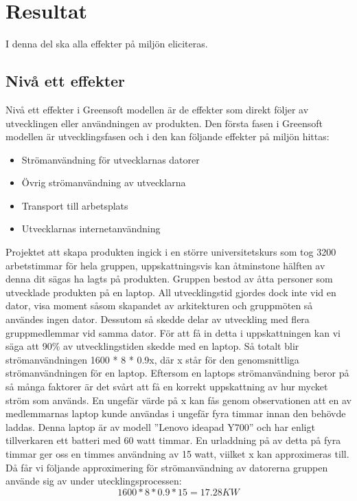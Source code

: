 \section{Resultat}
\label{sec:joel_a-results}
I denna del ska alla effekter på miljön eliciteras. 
\subsection{Nivå ett effekter}
Nivå ett effekter i Greensoft modellen är de effekter som direkt följer av utvecklingen eller användningen av produkten. Den första fasen i Greensoft modellen är utvecklingsfasen och i den kan följande effekter på miljön hittas:
\begin{itemize}
	\item Strömanvändning för utvecklarnas datorer
	\item Övrig strömanvändning av utvecklarna
	\item Transport till arbetsplats
	\item Utvecklarnas internetanvändning
\end{itemize}

Projektet att skapa produkten ingick i en större universitetskurs som tog 3200 arbetstimmar för hela gruppen, uppskattningsvis kan åtminstone hälften av denna dit sägas ha lagts på produkten. Gruppen bestod av åtta personer som utvecklade produkten på en laptop. All utvecklingstid gjordes dock inte vid en dator, visa moment såsom skapandet av arkitekturen och gruppmöten så användes ingen dator. Dessutom så skedde delar av utveckling med flera gruppmedlemmar vid samma dator. För att få in detta i uppskattningen kan vi säga att 90\% av utvecklingstiden skedde med en laptop. Så totalt blir strömanvändningen 1600 * 8 * 0.9x, där x står för den genomsnittliga strömanvändningen för en laptop. Eftersom en laptops strömanvändning beror på så många faktorer är det svårt att få en korrekt uppskattning av hur mycket ström som används. En ungefär värde på x kan fås genom observationen att en av medlemmarnas laptop kunde användas i ungefär fyra timmar innan den behövde laddas. Denna laptop är av modell ''Lenovo ideapad Y700'' och har enligt tillverkaren \cite{lenovo} ett batteri med 60 watt timmar. En urladdning på av detta på fyra timmar ger oss en timmes användning av 15 watt, viilket x kan approximeras till. Då får vi följande approximering för strömanvändning av datorerna gruppen använde sig av under utecklingsprocessen: $$1600 * 8 * 0.9 * 15 = 17.28KW$$

